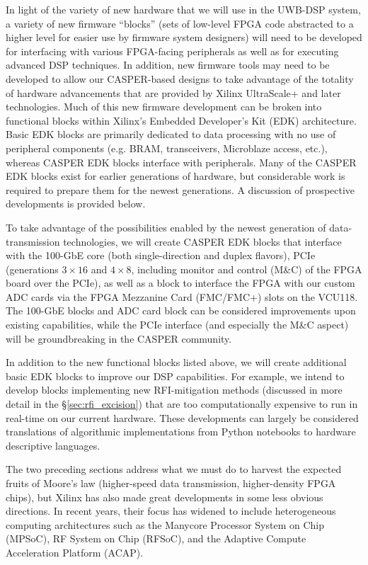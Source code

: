 \documentclass[10pt]{myNSF}
\begin{document}
In light of the variety of new hardware that we will use in the
UWB-DSP system, a variety of new firmware ``blocks'' (sets of
low-level FPGA code abstracted to a higher level for easier use by
firmware system designers) will need to be developed for interfacing
with various FPGA-facing peripherals as well as for executing advanced
DSP techniques.  In addition, new firmware tools may need to be
developed to allow our CASPER-based designs to take advantage of the
totality of hardware advancements that are provided by Xilinx
UltraScale+ and later technologies. Much of this new firmware
development can be broken into functional blocks within Xilinx's
Embedded Developer's Kit (EDK) architecture. Basic EDK blocks are
primarily dedicated to data processing with no use of peripheral
components (e.g. BRAM, transceivers, Microblaze access, etc.), whereas
CASPER EDK blocks interface with peripherals. Many of the CASPER EDK
blocks exist for earlier generations of hardware, but considerable
work is required to prepare them for the newest generations. A
discussion of prospective developments is provided below.

 To take advantage of the
possibilities enabled by the newest generation of data-transmission
technologies, we will create CASPER EDK blocks that interface with the
100-GbE core (both single-direction and duplex flavors), PCIe
(generations $3 \times 16$ and $4 \times 8$, including monitor and
control (M\&C) of the FPGA board over the PCIe), as well as a block to
interface the FPGA with our custom ADC cards via the FPGA Mezzanine
Card (FMC/FMC+) slots on the VCU118. The 100-GbE blocks and ADC card
block can be considered improvements upon existing capabilities, while
the PCIe interface (and especially the M\&C aspect) will be
groundbreaking in the CASPER community.

 In addition to the new functional
blocks listed above, we will create additional basic EDK blocks to
improve our DSP capabilities. For example, we intend to develop blocks
implementing new RFI-mitigation methods (discussed in more detail in
the \S\ref{sec:rfi_excision}) that are too computationally expensive
to run in real-time on our current hardware. These developments can
largely be considered translations of algorithmic implementations from
Python notebooks to hardware descriptive languages.


 The two preceding sections
address what we must do to harvest the expected fruits of Moore's law
(higher-speed data transmission, higher-density FPGA chips), but
Xilinx has also made great developments in some less obvious
directions. In recent years, their focus has widened to include
heterogeneous computing architectures such as the Manycore Processor
System on Chip (MPSoC), RF System on Chip (RFSoC), and the Adaptive
Compute Acceleration Platform (ACAP).
\end{document}
